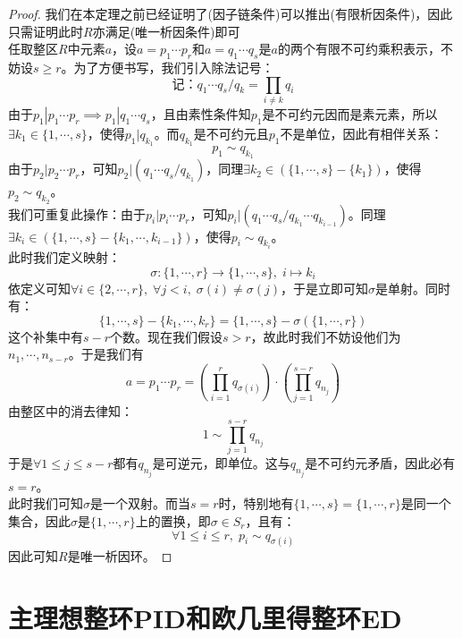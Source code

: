 \begin{proof}
我们在本定理之前已经证明了(因子链条件)可以推出(有限析因条件)，因此只需证明此时$R$亦满足(唯一析因条件)即可\\
\indent 任取整区$R$中元素$a$，设$a=p_1\cdots p_r$和$a=q_1\cdots q_s$是$a$的两个有限不可约乘积表示，不妨设$s\geq r$。为了方便书写，我们引入除法记号：
\[
\text{记：}q_1\cdots q_s/q_k=\prod_{i\neq k}q_i
\]
\indent 由于$p_1|p_1\cdots p_r\implies p_1|q_1\cdots q_s$，且由素性条件知$p_1$是不可约元因而是素元素，所以$\exists k_1\in\{1,\cdots,s\}$，使得$p_1|q_{k_1}$。而$q_{k_1}$是不可约元且$p_1$不是单位，因此有相伴关系：
\[
p_1\sim q_{k_1}
\]
\indent 由于$p_2|p_2\cdots p_r$，可知$p_2|(q_1\cdots q_s/q_{k_1})$，同理$\exists k_2\in (\{1,\cdots,s\}-\{k_1\})$，使得$p_2\sim q_{k_2}$。\\
\indent 我们可重复此操作：由于$p_i|p_i\cdots p_r$，可知$p_i|(q_1\cdots q_s/q_{k_1}\cdots q_{k_{i-1}})$。同理$\exists k_i\in (\{1,\cdots,s\}-\{k_1,\cdots,k_{i-1}\})$，使得$p_i\sim q_{k_i}$。\\
\indent 此时我们定义映射：
\[
\sigma \colon \{1,\cdots,r\}\to \{1,\cdots,s\},\; i\mapsto k_i
\]
\indent 依定义可知$\forall i\in \{2,\cdots,r\},\; \forall j<i,\; \sigma(i)\neq\sigma(j)$，于是立即可知$\sigma$是单射。同时有：
\[
\{1,\cdots,s\}-\{k_1,\cdots,k_{r}\}=\{1,\cdots,s\}-\sigma(\{1,\cdots,r\})
\]
这个补集中有$s-r$个数。现在我们假设$s>r$，故此时我们不妨设他们为$n_1,\cdots,n_{s-r}$。于是我们有
\[
a=p_1\cdots p_r=\left(\prod_{i=1}^r q_{\sigma(i)}\right)\cdot\left(\prod_{j=1}^{s-r} q_{n_j}\right)
\]
由整区中的消去律知：
\[
1\sim \prod_{j=1}^{s-r} q_{n_j}
\]
于是$\forall 1\leq j\leq s-r$都有$q_{n_j}$是可逆元，即单位。这与$q_{n_j}$是不可约元矛盾，因此必有$s=r$。\\
\indent 此时我们可知$\sigma$是一个双射。而当$s=r$时，特别地有$\{1,\cdots,s\}=\{1,\cdots,r\}$是同一个集合，因此$\sigma$是$\{1,\cdots,r\}$上的置换，即$\sigma\in S_r$，且有：
\[
\forall 1\leq i\leq r,\; p_i\sim q_{\sigma(i)}
\]
因此可知$R$是唯一析因环。
\end{proof}

\section{主理想整环PID和欧几里得整环ED}

